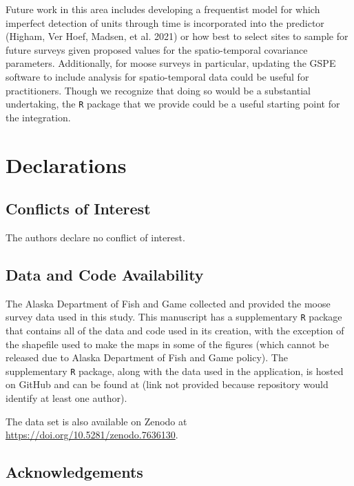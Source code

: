 \documentclass[smallextended]{svjour3}       %
\begin{document}
Future work in this area includes developing a frequentist model for
which imperfect detection of units through time is incorporated into the
predictor (Higham, Ver Hoef, Madsen, et al. 2021) or how best to select
sites to sample for future surveys given proposed values for the
spatio-temporal covariance parameters. Additionally, for moose surveys
in particular, updating the GSPE software to include analysis for
spatio-temporal data could be useful for practitioners. Though we
recognize that doing so would be a substantial undertaking, the
\texttt{R} package that we provide could be a useful starting point for
the integration.

\hypertarget{declarations}{%
\section{Declarations}\label{declarations}}

\hypertarget{conflicts-of-interest}{%
\subsection*{Conflicts of Interest}\label{conflicts-of-interest}}

The authors declare no conflict of interest.

\hypertarget{data-and-code-availability}{%
\subsection*{Data and Code
Availability}\label{data-and-code-availability}}

The Alaska Department of Fish and Game collected and provided the moose
survey data used in this study. This manuscript has a supplementary
\texttt{R} package that contains all of the data and code used in its
creation, with the exception of the shapefile used to make the maps in
some of the figures (which cannot be released due to Alaska Department
of Fish and Game policy). The supplementary \texttt{R} package, along
with the data used in the application, is hosted on GitHub and can be
found at (link not provided because repository would identify at least
one author).

The data set is also available on Zenodo at
\url{https://doi.org/10.5281/zenodo.7636130}.

\hypertarget{acknowledgements}{%
\subsection*{Acknowledgements}\label{acknowledgements}}
\end{document}
